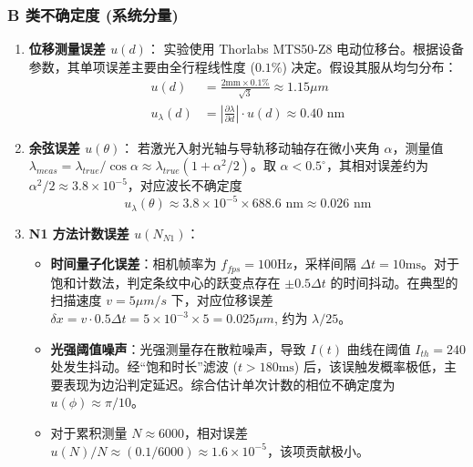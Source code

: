 \documentclass[twocolumn, a4paper, 10pt]{article}
\begin{document}
\subsubsection{B 类不确定度 (系统分量)}
\begin{enumerate}
    \item \textbf{位移测量误差 $u(d)$}：
    实验使用 Thorlabs MTS50-Z8 电动位移台。根据设备参数，其单项误差主要由全行程线性度 ($0.1\%$) 决定。假设其服从均匀分布：
    \begin{equation}
    \begin{aligned}
        u(d) &= \frac{2 \text{mm} \times 0.1\%}{\sqrt{3}} \approx 1.15 \mu m \\
        u_{\lambda}(d) &= \left| \frac{\partial \lambda}{\partial d} \right| \cdot u(d) \approx 0.40 \text{ nm}
    \end{aligned}
    \end{equation}

    \item \textbf{余弦误差 $u(\theta)$}：
    若激光入射光轴与导轨移动轴存在微小夹角 $\alpha$，测量值 $\lambda_{meas} = \lambda_{true} / \cos \alpha \approx \lambda_{true}(1+\alpha^2/2)$。取 $\alpha < 0.5^\circ$，其相对误差约为 $\alpha^2/2 \approx 3.8 \times 10^{-5}$，对应波长不确定度
    \begin{equation}
        u_{\lambda}(\theta) \approx 3.8 \times 10^{-5} \times 688.6 \text{ nm} \approx 0.026 \text{ nm}
    \end{equation}

    \item \textbf{N1 方法计数误差 $u(N_{N1})$}：
    \begin{itemize}
        \item \textbf{时间量子化误差}：相机帧率为 $f_{fps}=100\text{Hz}$，采样间隔 $\Delta t = 10\text{ms}$。对于饱和计数法，判定条纹中心的跃变点存在 $\pm 0.5 \Delta t$ 的时间抖动。在典型的扫描速度 $v = 5 \mu m/s$ 下，对应位移误差 $\delta x = v \cdot 0.5 \Delta t = 5 \times 10^{-3} \times 5 = 0.025 \mu m$, 约为 $\lambda/25$。
        \item \textbf{光强阈值噪声}：光强测量存在散粒噪声，导致 $I(t)$ 曲线在阈值 $I_{th}=240$ 处发生抖动。经“饱和时长”滤波 ($t>180\text{ms}$) 后，该误触发概率极低，主要表现为边沿判定延迟。综合估计单次计数的相位不确定度为 $u(\phi) \approx \pi/10$。
        \item 对于累积测量 $N \approx 6000$，相对误差 $u(N)/N \approx (0.1/6000) \approx 1.6 \times 10^{-5}$，该项贡献极小。
    \end{itemize}


\end{enumerate}
\end{document}

